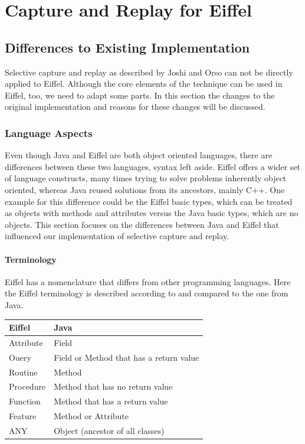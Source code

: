 \chapter{Capture and Replay for Eiffel}
\section{Differences to Existing Implementation}
Selective capture and replay as described by Joshi and Orso \cite{orso05may} can not be directly applied to Eiffel. Although the core elements of the technique can be used in Eiffel, too, we need to adapt some parts. In this section the changes to the original implementation and reasons for these changes will be discussed.

\subsection{Language Aspects}
Even though Java and Eiffel are both object oriented languages, there are differences between these two languages, syntax left aside. Eiffel offers a wider set of language constructs, many times trying to solve problems inherently object oriented, whereas Java reused solutions from its ancestors, mainly C++. One example for this difference could be the Eiffel basic types, which can be treated as objects with methods and attributes versus the Java basic types, which are no objects. This section focuses on the differences between Java and Eiffel that influenced our implementation of selective capture and replay.

\subsubsection{Terminology} %
Eiffel has a nomenclature that differs from other programming languages. Here the Eiffel terminology is described according to \cite{oosc2} and compared to the one from Java.
\begin{center}
\begin{tabular}[]{|l|l|} \hline
 \textbf{Eiffel}&\textbf{Java} \\ \hline
 Attribute&Field \\ \hline
 Ouery&Field or Method that has a return value \\ \hline
 Routine&Method \\ \hline
 Procedure&Method that has no return value \\ \hline
 Function&Method that has a return value \\ \hline
 Feature&Method or Attribute \\ \hline
 ANY&Object (ancestor of all classes) \\ \hline
\end{tabular} 
\end{center}

